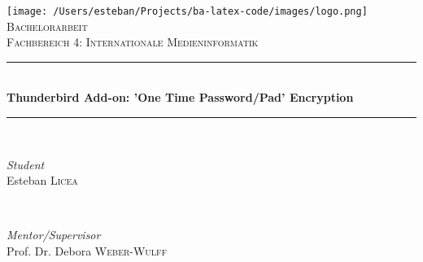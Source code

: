 \documentclass[12pt,a4paper]{article}
\begin{document}

\begin{titlepage} %
	\newcommand{\HRule}{\rule{\linewidth}{0.5mm}} %
	
	\center %
	
	
		\texttt{[image: /Users/esteban/Projects/ba-latex-code/images/logo.png]}\\[1cm] %
	
	\textsc{\Large Bachelorarbeit}\\[0.5cm] %
	
	\textsc{\large Fachbereich 4: Internationale Medieninformatik}\\[0.5cm] %
	
	
	\HRule\\[0.4cm]
	
	{\huge\bfseries Thunderbird Add-on: 'One Time Password/Pad' Encryption}\\[0.4cm] %
	
	\HRule\\[1.5cm]
	
	
	\begin{minipage}{0.4\textwidth}
		\begin{flushleft}
			\large
			\textit{Student}\\
			Esteban \textsc{Licea} %
		\end{flushleft}
	\end{minipage}
	~
	\begin{minipage}{0.4\textwidth}
		\begin{flushright}
			\large
			\textit{Mentor/Supervisor}\\
			Prof. Dr. Debora \textsc{Weber-Wulff} %
		\end{flushright}
	\end{minipage}
	

\end{titlepage}
\end{document}
